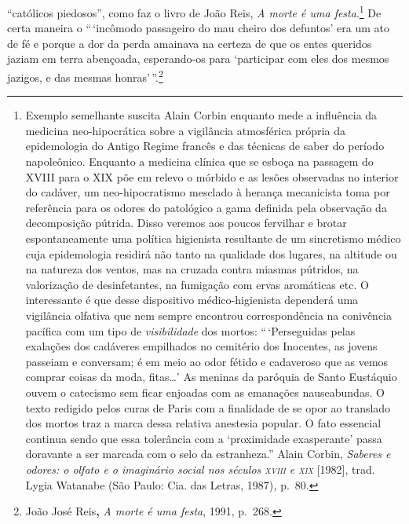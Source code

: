 ``católicos piedosos'', como faz o livro de João Reis, \textit{A morte é
uma festa}.\footnote{Exemplo semelhante suscita Alain Corbin enquanto
  mede a influência da medicina neo-hipocrática sobre a vigilância
  atmosférica própria da epidemologia do Antigo Regime francês e das
  técnicas de saber do período napoleônico. Enquanto a medicina clínica
  que se esboça na passagem do XVIII para o XIX põe em relevo o mórbido
  e as lesões observadas no interior do cadáver, um neo-hipocratismo
  mesclado à herança mecanicista toma por referência para os odores do
  patológico a gama definida pela observação da decomposição pútrida.
  Disso veremos aos poucos fervilhar e brotar espontaneamente uma
  política higienista resultante de um sincretismo médico cuja
  epidemologia residirá não tanto na qualidade dos lugares, na altitude
  ou na natureza dos ventos, mas na cruzada contra miasmas pútridos, na
  valorização de desinfetantes, na fumigação com ervas aromáticas etc. O
  interessante é que desse dispositivo médico-higienista dependerá uma
  vigilância olfativa que nem sempre encontrou correspondência na
  conivência pacífica com um tipo de \textit{visibilidade} dos mortos:
  ``\,`Perseguidas pelas exalações dos cadáveres empilhados no cemitério
  dos Inocentes, as jovens passeiam e conversam; é em meio ao odor
  fétido e cadaveroso que as vemos comprar coisas da moda, fitas\dots{}' As
  meninas da paróquia de Santo Eustáquio ouvem o catecismo sem ficar
  enjoadas com as emanações nauseabundas. O texto redigido pelos curas
  de Paris com a finalidade de se opor ao translado dos mortos traz a
  marca dessa relativa anestesia popular. O fato essencial continua
  sendo que essa tolerância com a `proximidade exasperante' passa
  doravante a ser marcada com o selo da estranheza.'' Alain Corbin,
  \textit{Saberes e odores: o olfato e o imaginário social nos séculos
  \textsc{xviii} e \textsc{xix}} {[}1982{]}, trad. Lygia Watanabe (São Paulo: Cia. das
  Letras, 1987)\textit{,} p.~80.} De certa maneira o ``\,`incômodo
passageiro do mau cheiro dos defuntos' era um ato de fé e porque a dor
da perda amainava na certeza de que os entes queridos jaziam em terra
abençoada, esperando-os para `participar com eles dos mesmos jazigos, e
das mesmas honras'\,''.\footnote{João José Reis\textbf{,} \textit{A morte
  é uma festa}, 1991, p.~268.}


